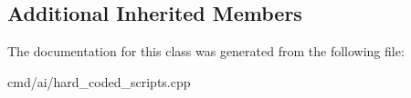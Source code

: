 \subsection*{Additional Inherited Members}


The documentation for this class was generated from the following file\+:\begin{DoxyCompactItemize}
\item 
cmd/ai/hard\+\_\+coded\+\_\+scripts.\+cpp\end{DoxyCompactItemize}
